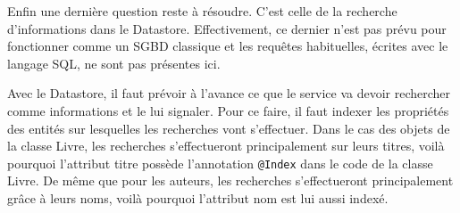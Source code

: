 Enfin une dernière question reste à résoudre. C’est celle de la recherche d’informations dans le Datastore. Effectivement, ce dernier n’est pas prévu pour fonctionner comme un SGBD classique et les requêtes habituelles, écrites avec le langage SQL, ne sont pas présentes ici.

Avec le Datastore, il faut prévoir à l’avance ce que le service va devoir rechercher comme informations et le lui signaler. Pour ce faire, il faut indexer les propriétés des entités sur lesquelles les recherches vont s’effectuer. Dans le cas des objets de la classe Livre, les recherches s’effectueront principalement sur leurs titres, voilà pourquoi l’attribut titre possède l’annotation \verb|@Index| dans le code de la classe Livre. De même que pour les auteurs, les recherches s’effectueront principalement grâce à leurs noms, voilà pourquoi l’attribut nom est lui aussi indexé. 








